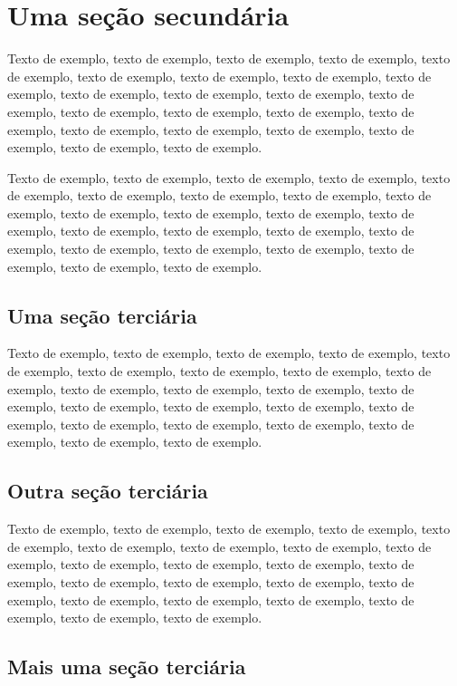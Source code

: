 \documentclass[
	12pt,				%
	oneside,			%
	a4paper,			%
	english,			%
	brazil				%
	]{abntex2ppgsi}
\begin{document}
\section{Uma seção secundária}

Texto de exemplo, texto de exemplo, texto de exemplo, texto de exemplo, texto de exemplo, texto de exemplo, texto de exemplo, texto de exemplo, texto de exemplo, texto de exemplo, texto de exemplo, texto de exemplo, texto de exemplo, texto de exemplo, texto de exemplo, texto de exemplo, texto de exemplo, texto de exemplo, texto de exemplo, texto de exemplo, texto de exemplo, texto de exemplo, texto de exemplo.

Texto de exemplo, texto de exemplo, texto de exemplo, texto de exemplo, texto de exemplo, texto de exemplo, texto de exemplo, texto de exemplo, texto de exemplo, texto de exemplo, texto de exemplo, texto de exemplo, texto de exemplo, texto de exemplo, texto de exemplo, texto de exemplo, texto de exemplo, texto de exemplo, texto de exemplo, texto de exemplo, texto de exemplo, texto de exemplo, texto de exemplo.

\subsection{Uma seção terciária}

Texto de exemplo, texto de exemplo, texto de exemplo, texto de exemplo, texto de exemplo, texto de exemplo, texto de exemplo, texto de exemplo, texto de exemplo, texto de exemplo, texto de exemplo, texto de exemplo, texto de exemplo, texto de exemplo, texto de exemplo, texto de exemplo, texto de exemplo, texto de exemplo, texto de exemplo, texto de exemplo, texto de exemplo, texto de exemplo, texto de exemplo.

\subsection{Outra seção terciária}

Texto de exemplo, texto de exemplo, texto de exemplo, texto de exemplo, texto de exemplo, texto de exemplo, texto de exemplo, texto de exemplo, texto de exemplo, texto de exemplo, texto de exemplo, texto de exemplo, texto de exemplo, texto de exemplo, texto de exemplo, texto de exemplo, texto de exemplo, texto de exemplo, texto de exemplo, texto de exemplo, texto de exemplo, texto de exemplo, texto de exemplo.

\subsection{Mais uma seção terciária}
\end{document}
